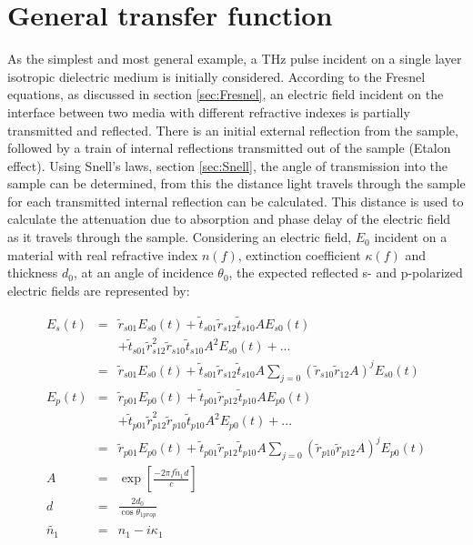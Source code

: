 \section{General transfer function}
\label{sec:LMI}
As the simplest and most general example, a THz pulse incident on a single layer isotropic dielectric medium is initially considered. According to the Fresnel equations, as discussed in section \ref{sec:Fresnel}, an electric field incident on the interface between two media with different refractive indexes is partially transmitted and reflected. There is an initial external reflection from the sample, followed by a train of internal reflections transmitted out of the sample (Etalon effect). Using Snell's laws, section \ref{sec:Snell}, the angle of transmission into the sample can be determined, from this the distance light travels through the sample for each transmitted internal reflection can be calculated. This distance is used to calculate the attenuation due to absorption and phase delay of the electric field as it travels through the sample. Considering an electric field, $E_{0}$ incident on a material
with real refractive index $n(f)$, extinction coefficient $\kappa(f)$ and thickness $d_{0}$, at an angle of incidence $\theta_{0}$, the expected reflected s- and p-polarized electric fields are represented by:

\begin{eqnarray}
E_{s}(t) &=& \widetilde{r}_{s01}E_{s0}(t) + \widetilde{t}_{s01}\widetilde{r}_{s12}\widetilde{t}_{s10}AE_{s0}(t)\nonumber\\& &+ \widetilde{t}_{s01}\widetilde{r}_{s12}^{2}\widetilde{r}_{s10}\widetilde{t}_{s10}A^{2}E_{s0}(t) + ...\\
&=& \widetilde{r}_{s01}E_{s0}(t) + \widetilde{t}_{s01}\widetilde{r}_{s12}\widetilde{t}_{s10}A\sum_{j=0}{(\widetilde{r}_{s10}\widetilde{r}_{12}A)^{j}E_{s0}(t)}\label{eq:tss}\\
E_{p}(t) &=& \widetilde{r}_{p01}E_{p0}(t) + \widetilde{t}_{p01}\widetilde{r}_{p12}\widetilde{t}_{p10}AE_{p0}(t)\nonumber\\& & + \widetilde{t}_{p01}\widetilde{r}_{p12}^{2}\widetilde{r}_{p10}\widetilde{t}_{p10}A^{2}E_{p0}(t) + ...\\
&=& \widetilde{r}_{p01}E_{p0}(t) + \widetilde{t}_{p01}\widetilde{r}_{p12}\widetilde{t}_{p10}A\sum_{j=0}{(\widetilde{r}_{p10}\widetilde{r}_{p12}A)^{j}E_{p0}(t)}\label{eq:tpp}\\
A &=& \exp\left[\frac{-2\pi f \widetilde{n}_{1} d}{c}\right]\\
d &=& \frac{2d_{0}}{\cos{\theta_{1 prop}}}\\
\widetilde{n_{1}} &=& n_{1} - i\kappa_{1}
\end{eqnarray}

